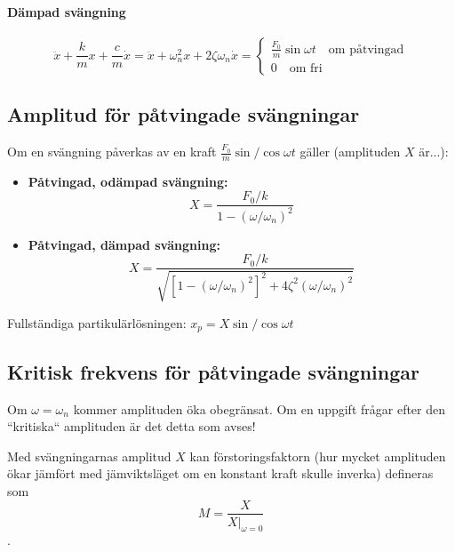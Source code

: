 \documentclass{article}
\newenvironment{ankiflashcard}[1]{}{}
\begin{document}
\begin{paracol}{2}
\begin{ankiflashcard}{Ange basekvationerna för dämpade svängingar}
\paragraph{Dämpad svängning}
$$\ddot x + \frac{k}{m} x +  \frac{c}{m} \dot x = \ddot x+\omega_n^2 x+2\zeta \omega_n \dot x=\begin{cases}
\frac{F_0}{m} \sin \omega t \quad\text{om påtvingad}\\
0 \quad \text{om fri}
\end{cases}$$
\end{ankiflashcard}

\begin{ankiflashcard}{Skriv upp formler för påtvingade svängningar}
    \subsection{Amplitud för påtvingade svängningar}
    Om en svängning påverkas av en kraft $\frac{F_0}{m}\sin/\cos \omega t$ gäller (amplituden $X$ är...):
    \begin{itemize}
        \item \textbf{Påtvingad, odämpad svängning: }$$X=\frac{F_0/k}{1-(\omega/\omega_n)^2}$$
        \item \textbf{Påtvingad, dämpad svängning: }$$X=\frac{F_0/k}{\sqrt{\left[1-(\omega/\omega_n)^2\right]^2+4\zeta^2(\omega/\omega_n)^2}}$$
    \end{itemize}
    Fullständiga partikulärlösningen: $x_p=X\sin / \cos \omega t$
\end{ankiflashcard}

\begin{ankiflashcard}{När ökar amplituden för påtvingade svängningar obegränsat?}
    \subsection{Kritisk frekvens för påtvingade svängningar}
    Om $\omega = \omega_n$ kommer amplituden öka obegränsat. Om en uppgift frågar efter den ``kritiska`` amplituden är det detta som avses!
\end{ankiflashcard}

\begin{ankiflashcard}{Definera förstorningsfaktor}
    Med svängningarnas amplitud $X$ kan förstoringsfaktorn (hur mycket amplituden ökar jämfört med jämviktsläget om en konstant kraft skulle inverka) defineras som
    $$M=\frac{X}{X|_{\omega=0}}$$.
\end{ankiflashcard}
\end{paracol}
\end{document}

